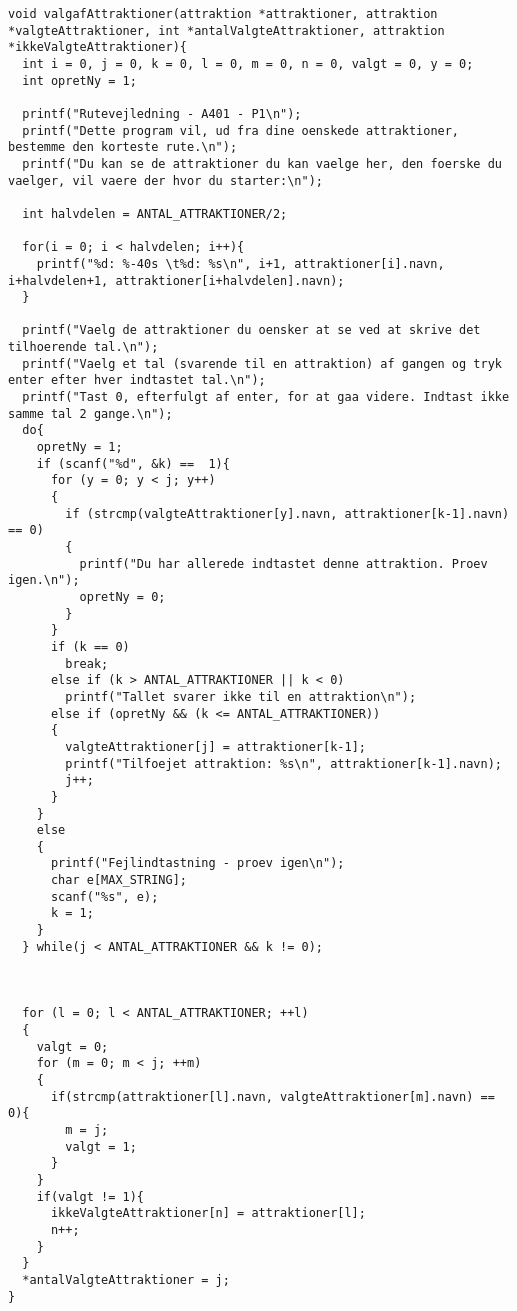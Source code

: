 \begin{lstlisting}
void valgafAttraktioner(attraktion *attraktioner, attraktion *valgteAttraktioner, int *antalValgteAttraktioner, attraktion *ikkeValgteAttraktioner){
  int i = 0, j = 0, k = 0, l = 0, m = 0, n = 0, valgt = 0, y = 0;
  int opretNy = 1;

  printf("Rutevejledning - A401 - P1\n");
  printf("Dette program vil, ud fra dine oenskede attraktioner, bestemme den korteste rute.\n");
  printf("Du kan se de attraktioner du kan vaelge her, den foerske du vaelger, vil vaere der hvor du starter:\n");

  int halvdelen = ANTAL_ATTRAKTIONER/2;

  for(i = 0; i < halvdelen; i++){
    printf("%d: %-40s \t%d: %s\n", i+1, attraktioner[i].navn, i+halvdelen+1, attraktioner[i+halvdelen].navn);
  }

  printf("Vaelg de attraktioner du oensker at se ved at skrive det tilhoerende tal.\n");
  printf("Vaelg et tal (svarende til en attraktion) af gangen og tryk enter efter hver indtastet tal.\n");
  printf("Tast 0, efterfulgt af enter, for at gaa videre. Indtast ikke samme tal 2 gange.\n");
  do{
    opretNy = 1;
    if (scanf("%d", &k) ==  1){
      for (y = 0; y < j; y++)
      {
        if (strcmp(valgteAttraktioner[y].navn, attraktioner[k-1].navn) == 0)
        {
          printf("Du har allerede indtastet denne attraktion. Proev igen.\n");
          opretNy = 0;
        }
      }
      if (k == 0)
        break;
      else if (k > ANTAL_ATTRAKTIONER || k < 0)
        printf("Tallet svarer ikke til en attraktion\n");
      else if (opretNy && (k <= ANTAL_ATTRAKTIONER))
      {
        valgteAttraktioner[j] = attraktioner[k-1];
        printf("Tilfoejet attraktion: %s\n", attraktioner[k-1].navn);
        j++;
      }
    }
    else
    {
      printf("Fejlindtastning - proev igen\n");
      char e[MAX_STRING];
      scanf("%s", e);
      k = 1;
    }
  } while(j < ANTAL_ATTRAKTIONER && k != 0);



  for (l = 0; l < ANTAL_ATTRAKTIONER; ++l)
  {
    valgt = 0;
    for (m = 0; m < j; ++m)
    {
      if(strcmp(attraktioner[l].navn, valgteAttraktioner[m].navn) == 0){
        m = j;
        valgt = 1;
      }
    }
    if(valgt != 1){
      ikkeValgteAttraktioner[n] = attraktioner[l];
      n++;
    }
  }
  *antalValgteAttraktioner = j;
}
\end{lstlisting}


